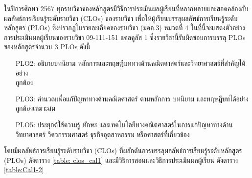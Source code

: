 \newpage
{}

ในปีการศึกษา 2567 ทุกรายวิชาของหลักสูตรมีวิธีการประเมินผลผู้เรียนที่หลากหลายและสอดคล้องกับผลลัพธ์การเรียนรู้ระดับรายวิชา (CLOs) ของรายวิชา เพื่อให้ผู้เรียนบรรลุผลลัพธ์การเรียนรู้ระดับหลักสูตร (PLOs) ซึ่งปรากฎในรายละเอียดของรายวิชา (มคอ.3) หมวดที่ 4 ในที่นี้จะแสดงตัวอย่างการประเมินผลผู้เรียนของรายวิชา 09-111-151 แคลคูลัส 1 ซึ่งรายวิชานี้รับผิดชอบการบรรลุ PLOs ของหลักสูตรจำนวน 3 PLOs ดังนี้
\begin{enumerate}[leftmargin=2.5cm]
	\item[PLO2:]อธิบายบทนิยาม หลักการและทฤษฎีบททางด้านคณิตศาสตร์และวิทยาศาสตร์ที่สำคัญได้อย่าง\\ถูกต้อง
	\item[PLO3:]คำนวณเพื่อแก้ปัญหาทางด้านคณิตศาสตร์ ตามหลักการ บทนิยาม และทฤษฎีบทได้อย่างถูกต้องเหมาะสม
	\item[PLO5:]ประยุกต์ใช้ความรู้ ทักษะ และเทคโนโลยีทางคณิตศาสตร์ในการแก้ปัญหาทางด้านวิทยาศาสตร์ วิศวกรรมศาสตร์ ธุรกิจอุตสาหกรรม หรือศาสตร์ที่เกี่ยวข้อง
\end{enumerate}
โดยมีผลลัพธ์การเรียนรู้ระดับรายวิชา (CLOs) ที่ผลักดันการบรรลุผลลัพธ์การเรียนรู้ระดับหลักสูตร (PLOs) ดังตาราง \ref{table: clos_cal1} และมีวิธีการสอนและวิธีการประเมินผลผู้เรียน ดังตาราง \ref{table:Cal1-2}

